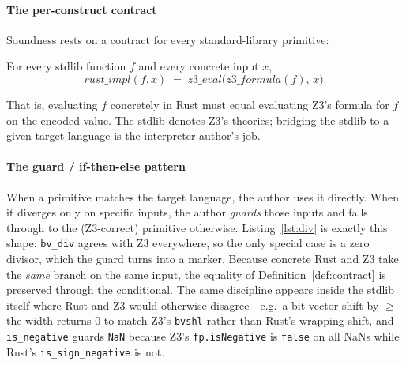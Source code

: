 \documentclass[sigplan,review,anonymous]{acmart}
\theoremstyle{definition}
\theoremstyle{remark}
\newcommand{\code}[1]{\texttt{#1}}
\begin{document}
\paragraph{The per-construct contract}
Soundness rests on a contract for every standard-library primitive:
\begin{definition}\label{def:contract}
For every stdlib function $f$ and every concrete input $x$,
\[
  \mathit{rust\_impl}(f, x) \;=\; \mathit{z3\_eval}\bigl(\mathit{z3\_formula}(f),\, x\bigr).
\]
\end{definition}
That is, evaluating $f$ concretely in Rust must equal evaluating Z3's formula for
$f$ on the encoded value. The stdlib denotes Z3's theories; bridging the stdlib
to a given target language is the interpreter author's job.

\paragraph{The guard / if-then-else pattern}
When a primitive matches the target language, the author uses it directly. When
it diverges only on specific inputs, the author \emph{guards} those inputs and
falls through to the (Z3-correct) primitive otherwise. Listing~\ref{lst:div} is
exactly this shape: \code{bv\_div} agrees with Z3 everywhere, so the only special
case is a zero divisor, which the guard turns into a marker. Because concrete Rust
and Z3 take the \emph{same} branch on the same input, the equality of
Definition~\ref{def:contract} is preserved through the conditional. The same
discipline appears inside the stdlib itself where Rust and Z3 would otherwise
disagree---e.g.\ a bit-vector shift by $\geq$ the width returns $0$ to match Z3's
\code{bvshl} rather than Rust's wrapping shift, and \code{is\_negative} guards
\code{NaN} because Z3's \code{fp.isNegative} is \code{false} on all NaNs while
Rust's \code{is\_sign\_negative} is not.
\end{document}
